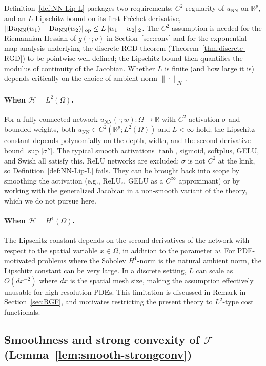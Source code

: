 \documentclass[twoside,11pt]{article}
\newcommand{\R}{\mathbb{R}}
\newcommand{\D}{\mathrm{D}}
\newcommand{\NN}{\mathrm{NN}}
\newcommand{\calF}{\mathcal{F}}
\newcommand{\calH}{\mathcal{H}}
\begin{document}
Definition~\ref{def:NN-Lip-L} packages two requirements: $C^2$ regularity of $u_\NN$ on $\R^p$, and an $L$-Lipschitz bound on its first Fr\'echet derivative,
$\|\D u_\NN(w_1)-\D u_\NN(w_2)\|_{\rm op}\le L\|w_1-w_2\|_2$. The $C^2$ assumption is needed for the Riemannian Hessian of $g(\cdot\,;v)$ in Section~\ref{sec:conv} and for the exponential-map analysis underlying the discrete RGD theorem (Theorem~\ref{thm:discrete-RGD}) to be pointwise well defined; the Lipschitz bound then quantifies the modulus of continuity of the Jacobian. Whether $L$ is finite (and how large it is) depends critically on the choice of ambient norm $\|\cdot\|_\calH$.

\paragraph{When $\calH=L^2(\Omega)$.}
For a fully-connected network $u_\NN(\cdot;w):\Omega\to\R$ with $C^2$ activation
$\sigma$ and bounded weights, both $u_\NN\in C^2(\R^p;L^2(\Omega))$ and $L<\infty$ hold; the
Lipschitz constant depends polynomially on the depth, width, and the second derivative bound
$\sup|\sigma''|$. The typical smooth activations
$\tanh$, sigmoid, softplus, GELU, and Swish all satisfy this. ReLU networks are excluded: $\sigma$ is not $C^2$ at the kink, so Definition~\ref{def:NN-Lip-L} fails. They can be brought back into scope by smoothing the activation (e.g., $\mathrm{ReLU}_\varepsilon$, GELU as a $C^\infty$ approximant) or by working with the generalized Jacobian in a non-smooth variant of the theory, which we do not pursue here.

\paragraph{When $\calH=H^1(\Omega)$.}
The Lipschitz constant depends on the second derivatives of the network with respect to
the spatial variable $x\in\Omega$, in addition to the parameter $w$. For PDE-motivated
problems where the Sobolev $H^1$-norm is the natural ambient norm, the Lipschitz constant
can be very large. In a discrete setting, $L$ can scale as $O(dx^{-2})$ where $dx$ is the
spatial mesh size, making the assumption effectively unusable for high-resolution PDEs.
This limitation is discussed in Remark in Section~\ref{sec:RGF}, and motivates restricting
the present theory to $L^2$-type cost functionals.


\subsection{Smoothness and strong convexity of \texorpdfstring{$\calF$}{F} (Lemma~\ref{lem:smooth-strongconv})}\label{app:disc-F-smooth}
\label{app:disc-F}
\end{document}

